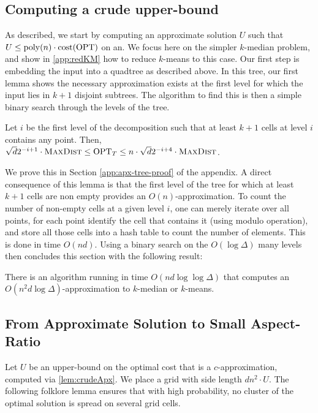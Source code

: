 \subsection{Computing a crude upper-bound}

As described, we start by computing an approximate solution $U$ such that $U \leq \operatorname{poly}(n) \cdot \operatorname{cost}(\text{OPT})$ on an.  We focus here on the simpler $k$-median
problem, and show in \cref{app:redKM} how to reduce $k$-means to this case. Our first step is embedding the input into a quadtree as described above. In this
tree, our first lemma shows the necessary approximation exists at the first level for which the input lies in $k+1$ disjoint subtrees. The algorithm to find
this is then a simple binary search through the levels of the tree.

\begin{lemma}\label{lem:apxTree}
Let $i$ be the first level of the decomposition such that at least $k+1$ cells at level $i$ contains any point. Then, $\sqrt{d}2^{-i+1} \cdot \textsc{MaxDist} \leq
\text{OPT}_T \leq n \cdot \sqrt{d}2^{-i+4} \cdot \textsc{MaxDist}$.
\end{lemma}

We prove this in Section \ref{app:apx-tree-proof} of the appendix. A direct consequence of this lemma is that the first level of the tree for which at least
$k+1$ cells are non empty provides an $O(n)$-approximation. To count the number of non-empty cells at a given level $i$, one can merely iterate over all
points, for each point identify the cell that contains it (using modulo operation), and store all those cells into a hash table to count the number of elements.
This is done in time $O(nd)$.  Using a binary search on the $O(\log \Delta)$ many levels then concludes this section with the following result:

\begin{lemma}\label{lem:crudeApx}
There is an algorithm running in time $O(nd \log \log \Delta)$ that computes an  $O(n^2 d \log \Delta)$-approximation to $k$-median or $k$-means.
\end{lemma}

\subsection{From Approximate Solution to Small Aspect-Ratio}
Let $U$ be an upper-bound on the optimal cost that is a $c$-approximation, computed via \cref{lem:crudeApx}. We place a grid with side length $d n^2\cdot U$.
The following folklore lemma ensures that with high probability, no cluster of the optimal solution is spread on several grid cells.

